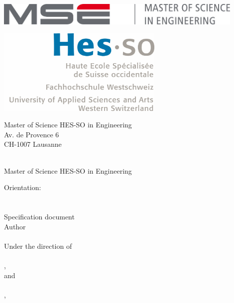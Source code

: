 
\begin{titlepage}
{\selectfont
	\begin{flushright}
		\begin{minipage}{0.5\textwidth}
			\begin{flushleft}
				\includegraphics[width=0.9\textwidth]{img/mse_logo}
			\end{flushleft}
		\end{minipage}%
		\begin{minipage}{0.5\textwidth}
			\begin{flushright}
				\includegraphics[width=0.6\textwidth]{img/hesso_logo}
			\end{flushright}
		\end{minipage}
		\begin{flushleft}
			\footnotesize
			Master of Science HES-SO in Engineering \\
			Av. de Provence 6 \\
			CH-1007 Lausanne
		\end{flushleft}
		~\\[0.5cm]
		
		{
		\Huge Master of Science HES-SO in Engineering\\[0.5cm]
		}
		
		{
		\LARGE Orientation: \Orientation\\[0.5cm]
		~\\[1cm]
		}
		{
			\Huge
			\ThesisTitle \\ [0.1cm]
			Specification document \\[1.5cm]
		}
		{
			\large
			Author\\[-0.3cm]
			\Huge \Author \\[0.8cm]
		}
		{
			\large
			Under the direction of \\
			\AdvisorOne \\
			\AdvisorOneSchool, \AdvisorOneResearchUnit \\
			and \\
			\AdvisorTwo \\
			\AdvisorTwoSchool, \AdvisorTwoResearchUnit \\[0.5cm]
		}
		

\end{flushright}}
\end{titlepage}
